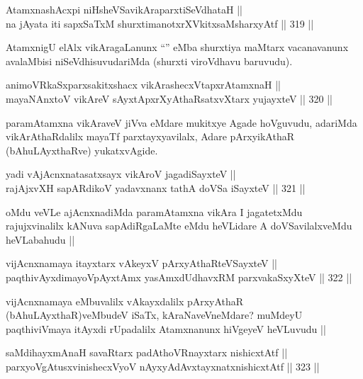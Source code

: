 \begin{shl}
AtamxnashAcxpi niHsheVSavikAraparxtiSeVdhataH || \\
na jAyata iti sapxSaTxM shurxtimanotxrXVkitxsaMsharxyAtf ||  319 ||  
\end{shl}

\begin{artha}
AtamxnigU elAlx vikAragaLanunx ``\stext'' eMba shurxtiya maMtarx vacanavanunx avalaMbisi niSeVdhisuvudariMda (shurxti viroVdhavu baruvudu).
\end{artha}

\begin{shl}
animoVRkaSxparxsakitxshacx vikArashecxVtapxrAtamxnaH || \\
mayaNAnxtoV vikAreV sAyxtApxrXyAthaRsatxvXtarx yujayxteV ||  320 ||  
\end{shl}

\begin{artha}
paramAtamxna vikAraveV jiVva eMdare mukitxye Agade hoVguvudu, adariMda vikArAthaRdalilx mayaTf parxtayxyavilalx, Adare pArxyikAthaR (bAhuLAyxthaRve) yukatxvAgide.
\end{artha}

\begin{shl}
yadi vA\s jAcnxnatasatxsayx vikAroV jagadiSayxteV || \\
rajAjxvXH sapARdikoV yadavxnanx tathA doVSa iSayxteV ||  321 ||  
\end{shl}

\begin{artha}
oMdu veVLe ajAcnxnadiMda paramAtamxna vikAra I jagatetxMdu rajujxvinalilx kANuva sapAdiRgaLaMte eMdu heVLidare A doVSavilalxveMdu heVLabahudu ||
\end{artha}


\begin{shl}
vijAcnxnamaya itayxtarx vAkeyxV pArxyAthaRteVSayxteV || \\
paqthivAyxdimayoV\s pAyxtAmx yasAmxdUdhavxRM parxvakaSxyXteV ||  322 ||  
\end{shl}

\begin{artha}
vijAcnxnamaya eMbuvalilx vAkayxdalilx pArxyAthaR (bAhuLAyxthaR)veMbudeV iSaTx, kAraNaveVneMdare? muMdeyU paqthiviVmaya itAyxdi rUpadalilx Atamxnanunx hiVgeyeV heVLuvudu ||
\end{artha}

\begin{shl}
saMdihayxmAnaH savaRtarx padAthoVR\s nayxtarx nishicxtAtf ||  \\
parxyoVgAtusxvinishecxVyoV nAyxyAdAvx\s tayxnatxnishicxtAtf ||  323 ||  
\end{shl}

